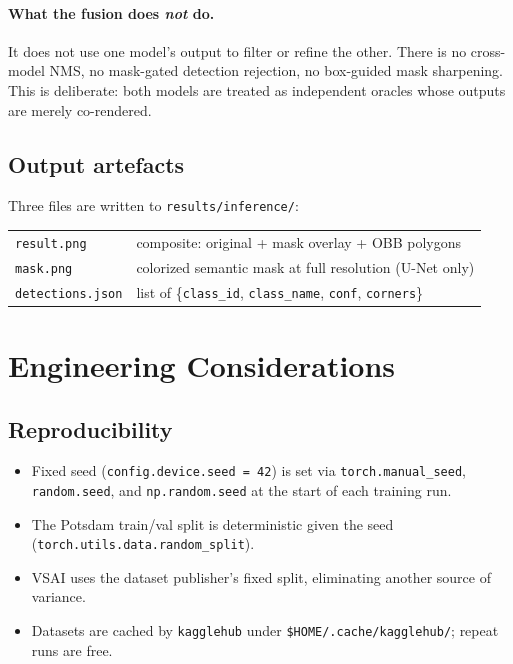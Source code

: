 \documentclass[11pt,a4paper]{article}
\begin{document}
\paragraph{What the fusion does \emph{not} do.} It does not use one model's output
to filter or refine the other. There is no cross-model NMS, no mask-gated detection
rejection, no box-guided mask sharpening. This is deliberate: both models are
treated as independent oracles whose outputs are merely co-rendered.

\subsection{Output artefacts}

Three files are written to \texttt{results/inference/}:

\begin{center}\footnotesize
\begin{tabular}{ll}
\toprule
\texttt{result.png}     & composite: original + mask overlay + OBB polygons \\
\texttt{mask.png}       & colorized semantic mask at full resolution (U-Net only) \\
\texttt{detections.json} & list of \{\texttt{class\_id}, \texttt{class\_name}, \texttt{conf}, \texttt{corners}\} \\
\bottomrule
\end{tabular}
\end{center}

\section{Engineering Considerations}

\subsection{Reproducibility}

\begin{itemize}[leftmargin=*, itemsep=2pt]
  \item Fixed seed (\texttt{config.device.seed = 42}) is set via
    \texttt{torch.manual\_seed}, \texttt{random.seed}, and \texttt{np.random.seed}
    at the start of each training run.
  \item The Potsdam train/val split is deterministic given the seed
    (\texttt{torch.utils.data.random\_split}).
  \item VSAI uses the dataset publisher's fixed split, eliminating
    another source of variance.
  \item Datasets are cached by \texttt{kagglehub} under
    \texttt{\$HOME/.cache/kagglehub/}; repeat runs are free.
\end{itemize}
\end{document}
